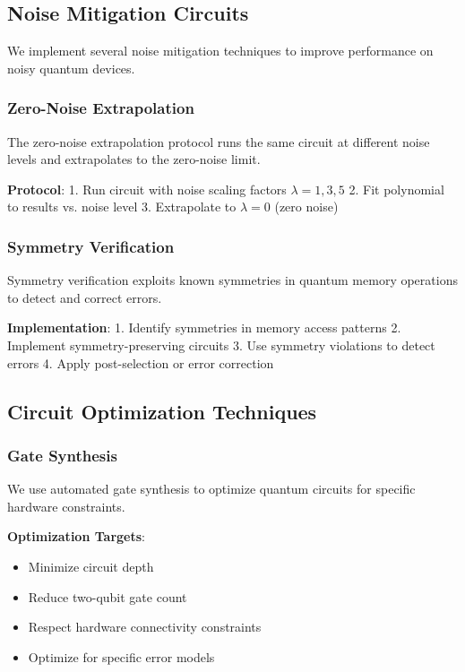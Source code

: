 \subsection{Noise Mitigation Circuits}

We implement several noise mitigation techniques to improve performance on noisy quantum devices.

\subsubsection{Zero-Noise Extrapolation}

The zero-noise extrapolation protocol runs the same circuit at different noise levels and extrapolates to the zero-noise limit.

\textbf{Protocol}:
1. Run circuit with noise scaling factors $\lambda = 1, 3, 5$
2. Fit polynomial to results vs. noise level
3. Extrapolate to $\lambda = 0$ (zero noise)

\subsubsection{Symmetry Verification}

Symmetry verification exploits known symmetries in quantum memory operations to detect and correct errors.

\textbf{Implementation}:
1. Identify symmetries in memory access patterns
2. Implement symmetry-preserving circuits
3. Use symmetry violations to detect errors
4. Apply post-selection or error correction

\subsection{Circuit Optimization Techniques}

\subsubsection{Gate Synthesis}

We use automated gate synthesis to optimize quantum circuits for specific hardware constraints.

\textbf{Optimization Targets}:
\begin{itemize}
    \item Minimize circuit depth
    \item Reduce two-qubit gate count
    \item Respect hardware connectivity constraints
    \item Optimize for specific error models
\end{itemize}

